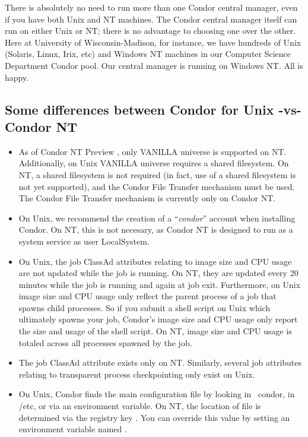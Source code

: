 There is absolutely no need to run more than one Condor central manager, even if
you have both Unix and NT machines.  The Condor central manager itself can run on
either Unix or NT; there is no advantage to choosing one over the other.
Here at University of Wisconsin-Madison, for instance, we have hundreds of
Unix (Solaris, Linux, Irix, etc) and Windows NT machines in our Computer Science Department Condor pool.  Our
central manager is running on Windows NT.  All is happy.

\subsection{Some differences between Condor for Unix -vs- Condor NT}

\begin{itemize}

\item As of Condor NT Preview \VersionNotice, only VANILLA universe is
supported on NT.  Additionally, on Unix VANILLA universe requires a shared
filesystem.  On NT, a shared filesystem is not required (in fact, use of a
shared filesystem is not yet supported), and the Condor File Transfer
mechanism must be used. \Note The Condor File Transfer mechanism is
currently only on Condor NT.

\item On Unix, we recommend the creation of a ``\textit{condor}'' account
when installing Condor.  On NT, this is not necesary, as Condor NT is
designed to run as a system service as user LocalSystem.

\item On Unix, the job ClassAd attributes relating to image size and CPU
usage are not updated while the job is running.  On NT, they are updated
every 20 minutes while the job is running and again at job exit.  Furthermore, on Unix image size and CPU usage only 
reflect the parent process of a job that spawns child processes.  So if you
submit a shell script on Unix which ultimately spawns your job, Condor's
image size and CPU usage only report the size and usage of the shell script.
On NT, image size and CPU usage is totaled across all processes spawned by
the job.

\item The job ClassAd attribute  exists only on NT.
Similarly, several job attributes relating to transparent process
checkpointing only exist on Unix.

\item On Unix, Condor finds the  main configuration file by
looking in ~condor, in /etc, or via an environment variable.  On NT, the
location of  file is determined via the registry key
.  You can override this value by
setting an environment variable named .


\end{itemize}
